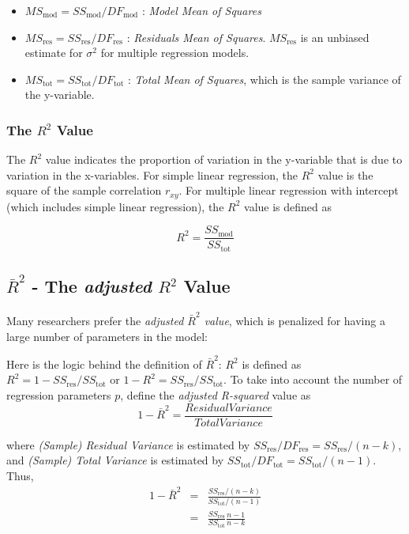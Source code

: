 \begin{itemize}
  \item $MS_\text{mod} = SS_\text{mod} / DF_\text{mod}$ : \emph{Model Mean of Squares}
  \item $MS_\text{res} = SS_\text{res} / DF_\text{res}$ : \emph{Residuals Mean of Squares}. $MS_\text{res}$ is an unbiased estimate for $\sigma^2$ for multiple regression models.
  \item $MS_\text{tot} = SS_\text{tot} / DF_\text{tot}$ : \emph{Total Mean of Squares}, which is the sample variance of the y-variable.
\end{itemize}

\subsubsection{The $R^2$ Value}

The $R^2$ value indicates the proportion of variation in the y-variable that is due to variation in the x-variables. For simple linear regression, the $R^2$ value is the square of the sample correlation $r_{xy}$. For multiple linear regression with intercept (which includes simple linear regression), the $R^2$ value is defined as

\begin{equation}
  R^2 = \frac{SS_\text{mod}}{SS_\text{tot}}
\end{equation}

\subsection{$\bar{R}^2$ - The \emph{adjusted} $R^2$ Value}\label{sec:adjustedR2}

Many researchers prefer the \emph{adjusted $\bar{R}^2$ value}, which is penalized for having a large number of parameters in the model:

Here is the logic behind the definition of $\bar{R}^2$:
$R^2$ is defined as $R^2 = 1 - SS_\text{res}/SS_\text{tot}$ or $1 - R^2 = SS_\text{res}/SS_\text{tot}$. To take into account the number of regression parameters $p$, define the \emph{adjusted R-squared} value as
\begin{equation}
  1- \bar{R}^2 = \frac{ResidualVariance }{Total Variance}
\end{equation}

where \emph{(Sample) Residual Variance} is estimated by $SS_\text{res}/DF_\text{res} = SS_\text{res}/(n-k)$, and \emph{(Sample) Total Variance} is estimated by $SS_\text{tot}/DF_\text{tot} = SS_\text{tot}/(n-1)$. Thus,
\begin{eqnarray}
    1 - \bar{R}^2 &=& \frac{SS_\text{res}/(n - k)}{SS_\text{tot}/(n - 1)} \nonumber \\
          	&=& \frac{SS_\text{res}}{SS_\text{tot}}\frac{n - 1}{n - k}
\end{eqnarray}

